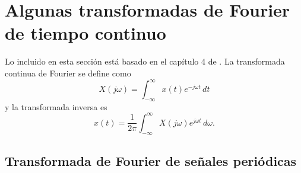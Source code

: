 \documentclass[a4paper]{report}
\begin{document}
 
 
 
 
 
 
 
 
 
 
 
 
 
 
 
 
 
 
 
 
 
 
 
 
 
 
 
 
 
 
 
 
 
 
 
 
 
 
 
 
 
 
 
 
 
 
 
 
 
 
 
 
 
 
 
 
 
 
 
 
 
 
 
 
 
 

 
\appendix 
 
\chapter{Algunas transformadas de Fourier de tiempo continuo}\label{ap:continous_fourier_transforms}

Lo incluido en esta sección está basado en el capítulo 4 de \cite{oppenheim1997signals}. La transformada continua de Fourier se define como
\begin{equation}\label{eq:continuous_fourier_transform_definition}
 X(j\omega) = \int_{-\infty}^{\infty}x(t)e^{-j\omega t}\,dt 
\end{equation}
y la transformada inversa es
\begin{equation}\label{eq:continuous_fourier_transform_definition_inverse}
 x(t)=\frac{1}{2\pi}\int_{-\infty}^{\infty}X(j\omega)e^{j\omega t}\,d\omega.
\end{equation}

\section{Transformada de Fourier de señales periódicas}
\end{document}
